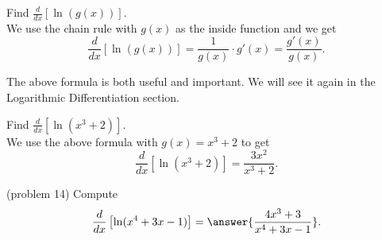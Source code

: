 \documentclass{ximera}
\begin{document}
\begin{example}[example 14]
Find $\frac{d}{dx} \left[\ln(g(x))\right]$.\\
We use the chain rule with $g(x)$ as the inside function and we get
\[
\frac{d}{dx} \left[\ln(g(x))\right] = \frac{1}{g(x)}\cdot g'(x) = \frac{g'(x)}{g(x)}.
\]
\end{example}

The above formula is both useful and important.  We will see it again in the Logarithmic Differentiation section.

\begin{example}
 Find $\frac{d}{dx} \left[\ln(x^3 + 2)\right]$.\\
 
We use the above formula with $g(x) = x^3 + 2$ to get
\[
\frac{d}{dx} \left[\ln(x^3 + 2)\right] = \frac{3x^2}{x^3 + 2}.
\]
\end{example}

\begin{problem}(problem 14)
Compute 
\[
\frac{d}{dx} \left[\ln(x^4 + 3x - 1)\right] = \answer{\frac{4x^3 + 3}{x^4 + 3x -1}}.
\]
\end{problem}

\begin{center}
\begin{foldable}
\end{foldable}
\end{center}
\end{document}
